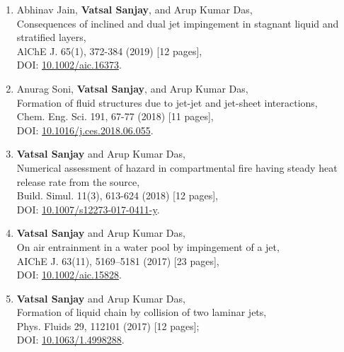 \documentclass[11pt,a4paper,roman,english,colorlinks,linkcolor=true]{moderncv}
\begin{document}
\begin{enumerate}[leftmargin=2.5cm]
	\item Abhinav Jain, \textbf{Vatsal Sanjay}, and Arup Kumar Das,\\
	Consequences of inclined and dual jet impingement in stagnant liquid and stratified layers,\\
	AlChE J. 65(1), 372-384  (2019) [12 pages],\\
	DOI: \href{https://doi.org/10.1002/aic.16373}{10.1002/aic.16373}.
	
	\item Anurag Soni, \textbf{Vatsal Sanjay}, and Arup Kumar Das,\\
	Formation of fluid structures due to jet-jet and jet-sheet interactions,\\
	Chem. Eng. Sci. 191, 67-77  (2018) [11 pages],\\
	DOI: \href{https://doi.org/10.1016/j.ces.2018.06.055}{10.1016/j.ces.2018.06.055}.
	
	\item \textbf{Vatsal Sanjay} and Arup Kumar Das,\\
	Numerical assessment of hazard in compartmental fire having steady heat release rate from the source,\\
	Build. Simul. 11(3), 613-624  (2018) [12 pages],\\
	DOI: \href{https://doi.org/10.1007/s12273-017-0411-y}{10.1007/s12273-017-0411-y}.
	
	\item \textbf{Vatsal Sanjay} and Arup Kumar Das,\\
	On air entrainment in a water pool by impingement of a jet,\\
	AIChE J. 63(11), 5169--5181  (2017) [23 pages],\\
	DOI: \href{https://doi.org/10.1002/aic.15828}{10.1002/aic.15828}.
	
	\item \textbf{Vatsal Sanjay} and Arup Kumar Das,\\
	Formation of liquid chain by collision of two laminar jets,\\
	Phys. Fluids 29, 112101  (2017) [12 pages];\\
	DOI: \href{https://doi.org/10.1063/1.4998288}{10.1063/1.4998288}.
	
\end{enumerate}
\end{document}
